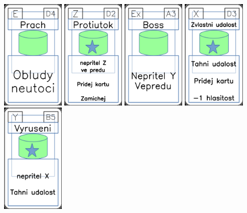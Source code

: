\documentclass[a4paper]{article}
\begin{document}
	\includegraphics[width=3.0cm]{img-4_48}
	\includegraphics[width=3.0cm]{img-5_46}
	\includegraphics[width=3.0cm]{img-4_2}
	\includegraphics[width=3.0cm]{img-5_17}
	\includegraphics[width=3.0cm]{img-5_39}
\end{document}
